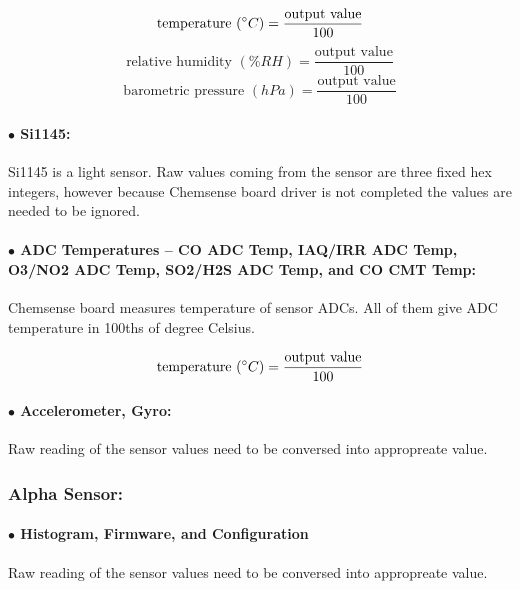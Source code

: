 {\centering
 \[ \text{temperature }(\degree C) = \frac{\text{output value}}{100} \]
 \[ \text{relative humidity }(\% RH) = \frac{\text{output value}}{100} \]
 \[ \text{barometric pressure }(hPa) = \frac{\text{output value}}{100} \]
 }

\paragraph{$\bullet$ Si1145:}

Si1145 is a light sensor. Raw values coming from the sensor are three fixed hex integers, however because Chemsense board driver is not completed the values are needed to be ignored.


\paragraph{$\bullet$ ADC Temperatures -- CO ADC Temp, IAQ/IRR ADC Temp, O3/NO2 ADC Temp, SO2/H2S ADC Temp, and CO CMT Temp:}
Chemsense board measures temperature of sensor ADCs. All of them give ADC temperature in 100ths of degree Celsius.


{\centering 
 \[ \text{temperature }(\degree C) = \frac{\text{output value}}{100} \]
 \par
}


\paragraph{$\bullet$ Accelerometer, Gyro:}
Raw reading of the sensor values need to be conversed into appropreate value.


\subsubsection{Alpha Sensor:}

\paragraph{$\bullet$ Histogram, Firmware, and Configuration}
Raw reading of the sensor values need to be conversed into appropreate value.